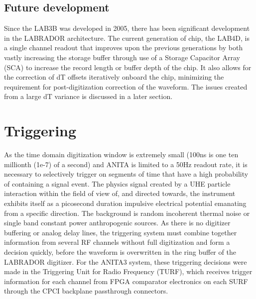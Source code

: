 	
	
	\subsection{Future development}
	Since the LAB3B was developed in 2005, there has been significant development in the LABRADOR architecture.  The current generation of chip, the LAB4D, is a single channel readout that improves upon the previous generations by both vastly increasing the storage buffer through use of a Storage Capacitor Array (SCA) to increase the record length or buffer depth of the chip.  It also allows for the correction of dT offsets iteratively onboard the chip, minimizing the requirement for post-digitization correction of the waveform.  The issues created from a large dT variance is discussed in a later section.
	
			
		
\section{Triggering}
	As the time domain digitization window is extremely small (100ns is one ten millionth (1e-7) of a second) and ANITA is limited to a 50Hz readout rate, it is necessary to selectively trigger on segments of time that have a high probability of containing a signal event.  The physics signal created by a UHE particle interaction within the field of view of, and directed towards, the instrument exhibits itself as a picosecond duration impulsive electrical potential emanating from a specific direction.  The background is random incoherent thermal noise or single band constant power anthropogenic sources.  As there is no digitizer buffering or analog delay lines, the triggering system must combine together information from several RF channels without full digitization and form a decision quickly, before the waveform is overwritten in the ring buffer of the LABRADOR digitizer.  For the ANITA3 system, these triggering decisions were made in the Triggering Unit for Radio Frequency (TURF), which receives trigger information for each channel from FPGA comparator electronics on each SURF through the CPCI backplane passthrough connectors.
	
